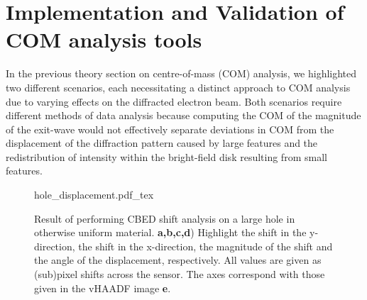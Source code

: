 \section{Implementation and Validation of COM analysis tools}

In the previous theory section on centre-of-mass (COM) analysis, we highlighted two different scenarios, each necessitating a distinct approach to COM analysis due to varying effects on the diffracted electron beam.
%
Both scenarios require different methods of data analysis because computing the COM of the magnitude of the exit-wave would not effectively separate deviations in COM from the displacement of the diffraction pattern caused by large features and the redistribution of intensity within the bright-field disk resulting from small features.

\begin{figure}[h]
    \centering
    \def\svgwidth{1\linewidth}
    {hole_displacement.pdf_tex}
    \caption{Result of performing CBED shift analysis on a large hole in otherwise uniform material. \textbf{a,b,c,d}) Highlight the shift in the y-direction, the shift in the x-direction, the magnitude of the shift and the angle of the displacement, respectively. All values are given as (sub)pixel shifts across the sensor. The axes correspond with those given in the vHAADF image \textbf{e}.}
    \label{fig:hole_dis}
\end{figure}

